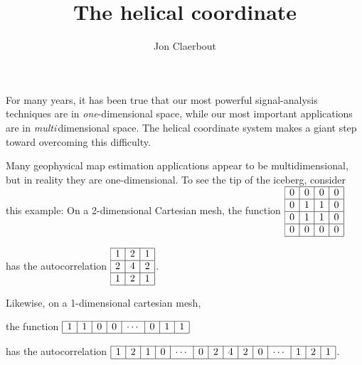
\title{The helical coordinate}
\author{Jon Claerbout}
\maketitle
\label{paper:hlx}

For many years, it has been true that
our most powerful signal-analysis techniques
are in {\em  one}-dimensional space,
while our most important applications are in {\em  multi\,}dimensional space.
The helical coordinate system makes a giant step
toward overcoming this difficulty.

\par
Many geophysical map estimation applications appear to be multidimensional,
but in reality they are one-dimensional.
To see the tip of the iceberg, consider this example:
On a 2-dimensional Cartesian mesh, the function
$
\begin{array}{|r|r|r|r|}
        \hline
        0 & 0 & 0 &0 \\
        \hline
        0 & 1 & 1 &0 \\
        \hline
        0 & 1 & 1 &0 \\
        \hline
        0 & 0 & 0 &0 \\
        \hline
\end{array}
$
\par\noindent
has the autocorrelation
$
\begin{array}{|r|r|r|} \hline
        1 & 2 & 1\\
        \hline
        2 & 4 & 2\\
        \hline
        1 & 2 & 1
        \\ \hline
\end{array}
$.

\par\noindent
Likewise, on a 1-dimensional cartesian mesh,
\par\noindent
the function $
\begin{array}{|r|r|r|r|r|r|r|r|r|r|r|r|r|} \hline
 1&1&0&0& \cdots& 0& 1&1
        \\ \hline
\end{array}
$
\par\noindent
has the autocorrelation
$ %
\begin{array}{|r|r|r|r|r|r|r|r|r|r|r|r|r|r|r|r|r|r|r|} \hline
 1&2&1&0&\cdots&0&2&4&2&0&\cdots&1&2&1
        \\ \hline
\end{array}
$.


